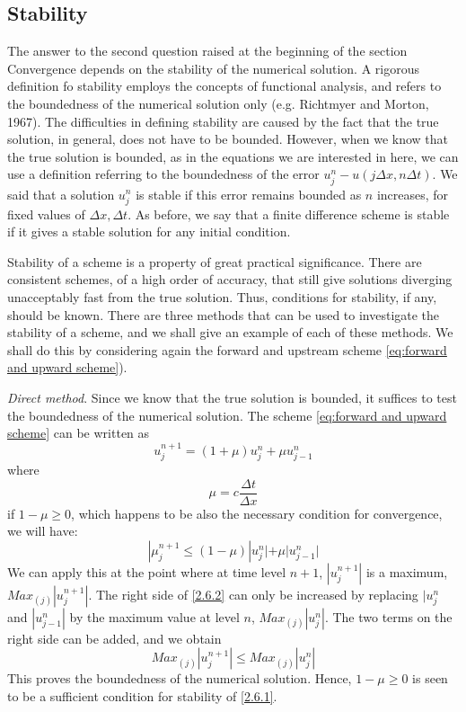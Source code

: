 \subsection{Stability}
The answer to the second question raised at the beginning of the section Convergence depends on the stability of the numerical solution. A rigorous definition fo stability employs the concepts of functional analysis, and refers to the boundedness of the numerical solution only (e.g. Richtmyer and Morton, 1967). The difficulties in defining stability are caused by the fact that the true solution, in general, does not have to be bounded. However, when we know that the true solution is bounded, as in the equations we are interested in here, we can use a definition referring to the boundedness of the error $u_j^n-u(j\Delta x, n\Delta t)$. We said that a solution $u_j^n$ is stable if this error remains bounded as $n$ increases, for fixed values of $\Delta x, \Delta t$. As before, we say that a finite difference scheme is stable if it gives a stable solution for any initial condition.

Stability of a scheme is a property of great practical significance. There are consistent schemes, of a high order of accuracy, that still give solutions diverging unacceptably fast from the true solution. Thus, conditions for stability, if any, should be known. There are three methods that can be used to investigate the stability of a scheme, and we shall give an example of each of these methods. We shall do this by considering again the forward and upstream scheme \ref{eq:forward and upward scheme}).

\textit{Direct method}. Since we know that the true solution is bounded, it suffices to test the boundedness of the numerical solution. The scheme \ref{eq:forward and upward scheme} can be written as
\begin{equation}\label{2.6.1}
	u_j^{n+1}=(1+\mu)u_j^n+\mu u^n_{j-1}
\end{equation}
where
$$\mu=c\frac{\Delta t}{\Delta x}$$
if $1-\mu\geq 0$, which happens to be also the necessary condition for convergence, we will have:
\begin{equation}\label{2.6.2}
	|\mu_j^{n+1}\leq(1-\mu)|u_j^n|+\mu|u^n_{j-1}|
\end{equation}
We can apply this at the point where at time level $n+1$, $|u_j^{n+1}|$ is a maximum, $Max_{(j)}|u_j^{n+1}|$. The right side of \ref{2.6.2} can only be increased by replacing $|u_j^n$ and $|u_{j-1}^n|$ by the maximum value at level $n$, $Max_{(j)}|u_j^n|$. The two terms on the right side can be added, and we obtain
$$Max_{(j)}|u_j^{n+1}|\leq Max_{(j)}|u_j^n|$$
This proves the boundedness of the numerical solution. Hence, $1-\mu\geq 0$ is seen to be a sufficient condition for stability of \ref{2.6.1}.

